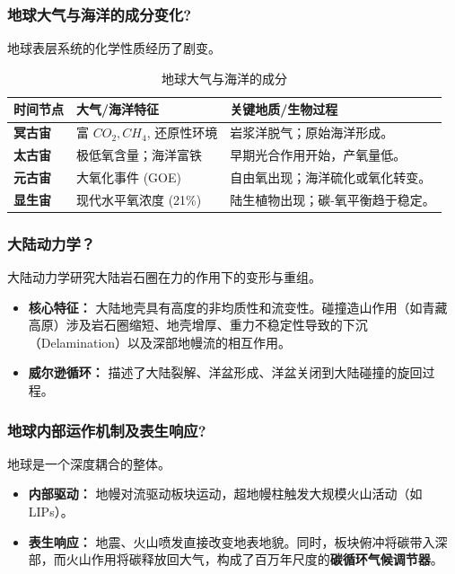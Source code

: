 \documentclass[12pt,a4paper]{article}
\begin{document}
	\subsubsection{地球大气与海洋的成分变化?}
	地球表层系统的化学性质经历了剧变。
	\begin{table}[htbp]
		\centering
		\caption{地球大气与海洋的成分}
		\begin{tabularx}{\textwidth}{l X X}
			\toprule
			时间节点 & 大气/海洋特征 & 关键地质/生物过程 \\
			\midrule
			\textbf{冥古宙} & 富 $CO_2, CH_4$, 还原性环境 & 岩浆洋脱气；原始海洋形成。 \\
			\textbf{太古宙} & 极低氧含量；海洋富铁 & 早期光合作用开始，产氧量低。 \\
			\textbf{元古宙} & 大氧化事件 (GOE) & 自由氧出现；海洋硫化或氧化转变。 \\
			\textbf{显生宙} & 现代水平氧浓度 (21\%) & 陆生植物出现；碳-氧平衡趋于稳定。 \\
			\bottomrule
		\end{tabularx}
	\end{table}
	
	\subsubsection{大陆动力学？}
	大陆动力学研究大陆岩石圈在力的作用下的变形与重组。
	\begin{itemize}
		\item \textbf{核心特征：} 大陆地壳具有高度的非均质性和流变性。碰撞造山作用（如青藏高原）涉及岩石圈缩短、地壳增厚、重力不稳定性导致的下沉（Delamination）以及深部地幔流的相互作用。
		\item \textbf{威尔逊循环：} 描述了大陆裂解、洋盆形成、洋盆关闭到大陆碰撞的旋回过程。
	\end{itemize}
	
	\subsubsection{地球内部运作机制及表生响应?}
	地球是一个深度耦合的整体。
	\begin{itemize}
		\item \textbf{内部驱动：} 地幔对流驱动板块运动，超地幔柱触发大规模火山活动（如 LIPs）。
		\item \textbf{表生响应：} 地震、火山喷发直接改变地表地貌。同时，板块俯冲将碳带入深部，而火山作用将碳释放回大气，构成了百万年尺度的\textbf{碳循环气候调节器}。
	\end{itemize}
	
\end{document}
